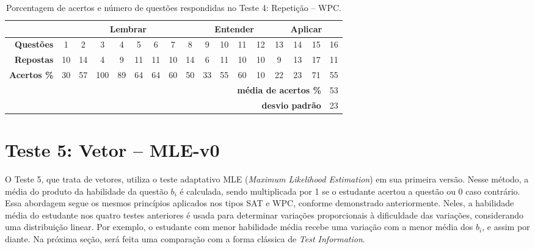 \begin{table}[htbp]
    \centering
    \caption{Porcentagem de acertos e número de questões respondidas no Teste 4: Repetição -- WPC.}
    \label{tab:respostas_atualizada_teste4}
    \begin{tabular}{|r|*{16}{c|}}
        \hline
        \multicolumn{1}{|l|}{} & \multicolumn{8}{c|}{\cellcolor{green!25}\textbf{Lembrar}} & \multicolumn{4}{c|}{\cellcolor{yellow!25}\textbf{Entender}} & \multicolumn{4}{c|}{\cellcolor{red!25}\textbf{Aplicar}} \\\hline
        \rowcolor[HTML]{D9D9D9} 
        \textbf{Questões}    & 1  & 2 & 3 & 4 & 5 & 6 & 7 & 8 & 9 & 10 & 11 & 12 & 13 & 14 & 15 & 16 \\
        \textbf{Repostas}   & 10 & 14 & 4 & 9 & 11 & 11 & 10 & 14 & 6 & 11 & 10 & 10 & 9 & 13 & 17 & 11 \\
        \rowcolor[HTML]{D9D9D9} 
        \textbf{Acertos \%} & 30 & 57 & 100 & 89 & 64 & 64 & 60 & 50 & 33 & 55 & 60 & 10 & 22 & 23 & 71 & 55 \\ \hline
        \multicolumn{11}{r}{} & \multicolumn{5}{r}{\cellcolor[HTML]{F9CB9C}\textbf{média de acertos \%}} & \multicolumn{1}{c}{\cellcolor[HTML]{F9CB9C}53} \\ 
        \multicolumn{11}{r}{} & \multicolumn{5}{r}{\cellcolor[HTML]{F9CB9C}\textbf{desvio padrão}} & \multicolumn{1}{c}{\cellcolor[HTML]{F9CB9C}23} \\ 
    \end{tabular}
\end{table}

\section{Teste 5: Vetor -- MLE-v0}

O Teste 5, que trata de vetores, utiliza o teste adaptativo MLE (\textit{Maximum Likelihood Estimation}) em sua primeira versão. Nesse método, a média do produto da habilidade da questão \( b_i \) é calculada, sendo multiplicada por 1 se o estudante acertou a questão ou 0 caso contrário. Essa abordagem segue os mesmos princípios aplicados nos tipos SAT e WPC, conforme demonstrado anteriormente. Neles, a habilidade média do estudante nos quatro testes anteriores é usada para determinar variações proporcionais à dificuldade das variações, considerando uma distribuição linear. Por exemplo, o estudante com menor habilidade média recebe uma variação com a menor média dos \( b_i \), e assim por diante. Na próxima seção, será feita uma comparação com a forma clássica de \textit{Test Information}.

